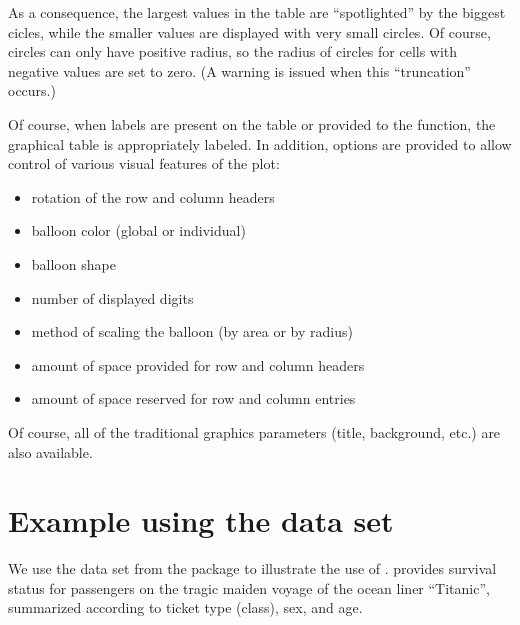 \documentclass[a4paper]{report}
\begin{document}
\begin{article}
As a consequence, the largest values in the table are ``spotlighted''
by the biggest cicles, while the smaller values are displayed
with very small circles.  Of course, circles can only have positive
radius, so the radius of circles for cells with negative values are
set to zero.  (A warning is issued when this ``truncation'' occurs.)

Of course, when labels are present on the table or provided to the
function, the graphical table is appropriately labeled.  In
addition, options are provided to allow control of various visual features
of the plot:
\begin{itemize}
  \item rotation of the row and column headers
  \item balloon color (global or individual) 
  \item balloon shape 
  \item number of displayed digits
  \item method of scaling the balloon (by area or by radius)
  \item amount of space provided for row and column headers
  \item amount of space reserved for row and column entries
\end{itemize}
Of course, all of the traditional graphics parameters (title,
background, etc.) are also available.


\section*{Example using the  data set}

We use the  data set from the  package
to illustrate the use of .  
provides survival status for passengers on the tragic maiden voyage
of the ocean liner ``Titanic'', summarized according to ticket type
(class), sex, and age.





\end{article}
\end{document}

